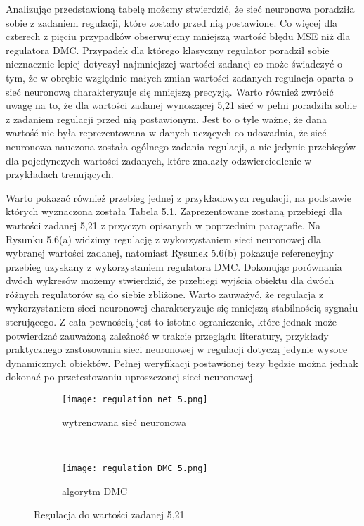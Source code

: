 Analizując przedstawioną tabelę możemy stwierdzić, że sieć neuronowa poradziła sobie z zadaniem regulacji, które zostało przed nią postawione. Co więcej dla czterech z pięciu przypadków obserwujemy mniejszą wartość błędu MSE niż dla regulatora DMC. Przypadek dla którego klasyczny regulator poradził sobie nieznacznie lepiej dotyczył najmniejszej wartości zadanej co może świadczyć o tym, że w obrębie względnie małych zmian wartości zadanych regulacja oparta o sieć neuronową charakteryzuje się mniejszą precyzją. Warto również zwrócić uwagę na to, że dla wartości zadanej wynoszącej 5,21 sieć w pełni poradziła sobie z zadaniem regulacji przed nią postawionym. Jest to o tyle ważne, że dana wartość nie była reprezentowana w danych uczących co udowadnia, że sieć neuronowa nauczona została ogólnego zadania regulacji, a nie jedynie przebiegów dla pojedynczych wartości zadanych, które znalazły odzwierciedlenie w przykładach trenujących. 

\par Warto pokazać również przebieg jednej z przykładowych regulacji, na podstawie których wyznaczona została Tabela 5.1. Zaprezentowane zostaną przebiegi dla wartości zadanej 5,21 z przyczyn opisanych w poprzednim paragrafie. Na Rysunku 5.6(a) widzimy regulację z wykorzystaniem sieci neuronowej dla wybranej wartości zadanej, natomiast Rysunek 5.6(b) pokazuje referencyjny przebieg uzyskany z wykorzystaniem regulatora DMC. Dokonując porównania dwóch wykresów możemy stwierdzić, że przebiegi wyjścia obiektu dla dwóch różnych regulatorów są do siebie zbliżone. Warto zauważyć, że regulacja z wykorzystaniem sieci neuronowej charakteryzuje się mniejszą stabilnością sygnału sterującego. Z cała pewnością jest to istotne ograniczenie, które jednak może potwierdzać zauważoną zależność w trakcie przeglądu literatury, przykłady praktycznego zastosowania sieci neuronowej w regulacji dotyczą jedynie wysoce dynamicznych obiektów. Pełnej weryfikacji postawionej tezy będzie można jednak dokonać po przetestowaniu uproszczonej sieci neuronowej.

\begin{figure}[!htb]
    \centering
    \begin{subfigure}[t]{0.5\textwidth}
        \centering
        \texttt{[image: regulation\_net\_5.png]}
        \caption{wytrenowana sieć neuronowa}
    \end{subfigure}%
    ~ 
    \begin{subfigure}[t]{0.5\textwidth}
        \centering
        \texttt{[image: regulation\_DMC\_5.png]}
        \caption{algorytm DMC}
    \end{subfigure}
    \caption{Regulacja do wartości zadanej 5,21}
\end{figure}

